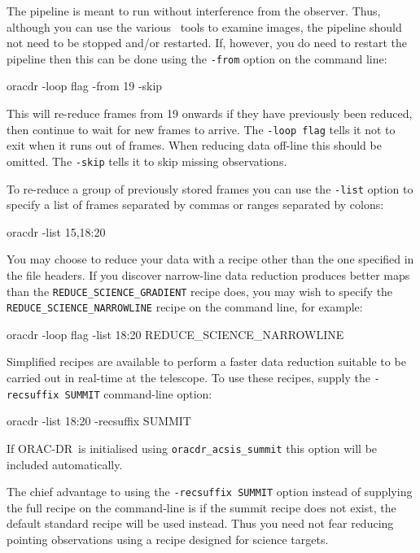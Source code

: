 \documentclass[twoside,11pt,nolof]{starlink}
\providecommand{\GAIA}{\xref{{\sc{Gaia}}}{sun214}{}}
\providecommand{\ORACDR}{{\footnotesize ORAC-DR}}
\begin{document}
The pipeline is meant to run without interference from the observer.
Thus, although you can use the various \GAIA\ tools to examine images,
the pipeline should not need to be stopped and/or restarted. If,
however, you do need to restart the pipeline then this can be done
using the \texttt{-from} option on the command line:

\begin{terminalv}
      oracdr -loop flag -from 19 -skip
\end{terminalv}

This will re-reduce frames from 19 onwards if they have previously
been reduced, then continue to wait for new frames to arrive. The \texttt{-loop flag} tells it not to exit when it runs out of frames. When
reducing data off-line this should be omitted. The \texttt{-skip} tells it to
skip missing observations.

To re-reduce a group of
previously stored frames you can use the \texttt{-list} option to specify
a list of frames separated by commas or ranges separated by colons:

\begin{terminalv}
      oracdr -list 15,18:20
\end{terminalv}

You may choose to reduce your data with a recipe other than the one specified
in the file headers. If you discover narrow-line data reduction produces
better maps than the \texttt{REDUCE\_SCIENCE\_GRADIENT} recipe does, you may wish
to specify the \texttt{REDUCE\_SCIENCE\_NARROWLINE} recipe on the command line,
for example:

\begin{terminalv}
      oracdr -loop flag -list 18:20 REDUCE\_SCIENCE\_NARROWLINE
\end{terminalv}

Simplified recipes are available to perform a faster
data reduction suitable to be carried out in real-time at the telescope. To
use these recipes, supply the \texttt{-recsuffix SUMMIT} command-line option:

\begin{terminalv}
      oracdr -list 18:20 -recsuffix SUMMIT
\end{terminalv}

If \ORACDR\ is initialised using \texttt{oracdr\_acsis\_summit} this
option will be included automatically.

The chief advantage to using the \texttt{-recsuffix SUMMIT} option instead of
supplying the full recipe on the command-line is if the summit recipe does
not exist, the default standard recipe will be used instead. Thus you need not
fear reducing pointing observations using a recipe designed for science
targets.
\end{document}
